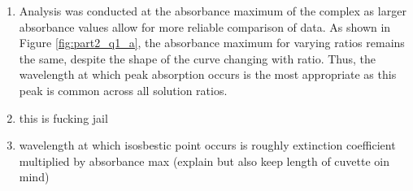 \begin{enumerate}
    \item Analysis was conducted at the absorbance maximum of the  complex as larger absorbance values allow for more reliable comparison of data. As shown in Figure \ref{fig:part2_q1_a}, the absorbance maximum for varying ratios remains the same, despite the shape of the curve changing with ratio. Thus, the wavelength at which peak absorption occurs is the most appropriate as this peak is common across all solution ratios.
    \item this is fucking jail
    \item wavelength at which isosbestic point occurs is roughly extinction coefficient multiplied by absorbance max (explain but also keep length of cuvette oin mind)
\end{enumerate}


